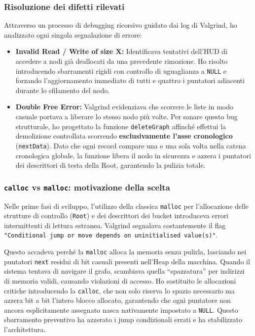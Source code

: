 \documentclass[12pt, a4paper]{article}
\begin{document}
\subsubsection{Risoluzione dei difetti rilevati}
Attraverso un processo di debugging ricorsivo guidato dai log di Valgrind, ho analizzato ogni singola segnalazione di errore:
\begin{itemize}[leftmargin=*]
    \item \textbf{Invalid Read / Write of size X:} Identificava tentativi dell'HUD di accedere a nodi già deallocati da una precedente rimozione. Ho risolto introducendo sbarramenti rigidi con controllo di uguaglianza a \texttt{NULL} e forzando l'aggiornamento immediato di tutti e quattro i puntatori adiacenti durante lo sfilamento del nodo.
    \item \textbf{Double Free Error:} Valgrind evidenziava che scorrere le liste in modo casuale portava a liberare lo stesso nodo più volte. Per sanare questo bug strutturale, ho progettato la funzione \texttt{deleteGraph} affinché effettui la demolizione controllata scorrendo \textbf{esclusivamente l'asse cronologico} (\texttt{nextData}). Dato che ogni record compare una e una sola volta nella catena cronologica globale, la funzione libera il nodo in sicurezza e azzera i puntatori dei descrittori di testa della Root, garantendo la pulizia totale.
\end{itemize}

\subsubsection{\texttt{calloc} vs \texttt{malloc}: motivazione della scelta}
Nelle prime fasi di sviluppo, l'utilizzo della classica \texttt{malloc} per l'allocazione delle strutture di controllo (\texttt{Root}) e dei descrittori dei bucket introduceva errori intermittenti di lettura estranea. Valgrind segnalava costantemente il flag \texttt{"Conditional jump or move depends on uninitialised value(s)"}.

Questo accadeva perché la \texttt{malloc} alloca la memoria senza pulirla, lasciando nei puntatori \texttt{next} residui di bit casuali presenti nell'Heap della macchina. Quando il sistema tentava di navigare il grafo, scambiava quella ``spazzatura'' per indirizzi di memoria validi, causando violazioni di accesso. Ho sostituito le allocazioni critiche introducendo la \texttt{calloc}, che non solo riserva lo spazio necessario ma azzera bit a bit l'intero blocco allocato, garantendo che ogni puntatore non ancora esplicitamente assegnato nasca nativamente impostato a \texttt{NULL}. Questo sbarramento preventivo ha azzerato i jump condizionali errati e ha stabilizzato l'architettura.
\end{document}
